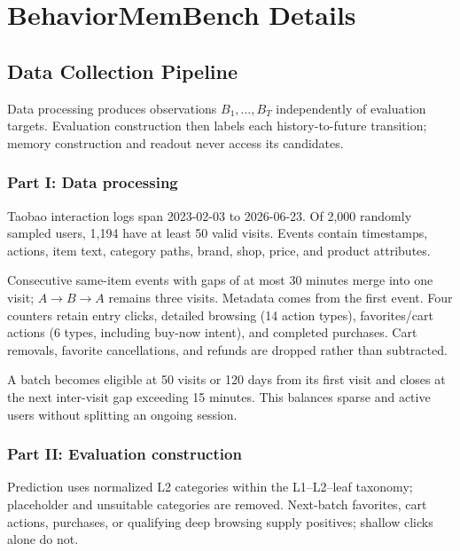 \documentclass[sigconf,nonacm,balance=false]{acmart}
\begin{document}



\appendix
\setlength{\emergencystretch}{2em}

\section{BehaviorMemBench Details}
\label{app:bench}

\subsection{Data Collection Pipeline}
\label{app:bench-pipeline}
Data processing produces observations $B_1,\dots,B_T$ independently of evaluation targets. Evaluation construction then labels each history-to-future transition; memory construction and readout never access its candidates.

\subsubsection{Part I: Data processing}
\label{app:bench-pipeline-data}
Taobao interaction logs span 2023-02-03 to 2026-06-23. Of 2{,}000 randomly sampled users, 1{,}194 have at least 50 valid visits. Events contain timestamps, actions, item text, category paths, brand, shop, price, and product attributes.

Consecutive same-item events with gaps of at most 30 minutes merge into one visit; $A\rightarrow B\rightarrow A$ remains three visits. Metadata comes from the first event. Four counters retain entry clicks, detailed browsing (14 action types), favorites/cart actions (6 types, including buy-now intent), and completed purchases. Cart removals, favorite cancellations, and refunds are dropped rather than subtracted.

A batch becomes eligible at 50 visits or 120 days from its first visit and closes at the next inter-visit gap exceeding 15 minutes. This balances sparse and active users without splitting an ongoing session.

\subsubsection{Part II: Evaluation construction}
\label{app:bench-pipeline-eval}
Prediction uses normalized L2 categories within the L1--L2--leaf taxonomy; placeholder and unsuitable categories are removed. Next-batch favorites, cart actions, purchases, or qualifying deep browsing supply positives; shallow clicks alone do not.
\end{document}
